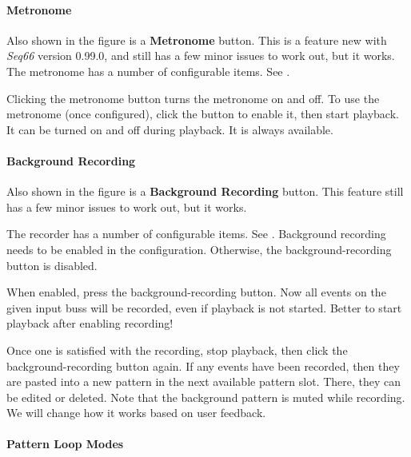 \paragraph{Metronome}
\label{paragraph:patterns_metronome}

   Also shown in the figure is a \textbf{Metronome} button.
   This is a feature new with \textsl{Seq66} version 0.99.0, and still has a few
   minor issues to work out, but it works.
   The metronome has a number of configurable items.
   See .

   Clicking the metronome button turns the metronome on and off.
   To use the metronome (once configured), click the button to enable it,
   then start playback.
   It can be turned on and off during playback.
   It is always available.

\paragraph{Background Recording}
\label{paragraph:patterns_background_recording}

   Also shown in the figure is a \textbf{Background Recording} button.
   This feature still has a few
   minor issues to work out, but it works.

   The recorder has a number of configurable items.
   See .
   Background recording needs to be enabled in the configuration.
   Otherwise, the background-recording button is disabled.

   When enabled, press the background-recording button.
   Now all events on the given input buss will be recorded, even if playback is
   not started.  Better to start playback after enabling recording!

   Once one is satisfied with the recording, stop playback, then
   click the background-recording button again.
   If any events have been recorded, then they are pasted into a new pattern in
   the next available pattern slot.
   There, they can be edited or deleted.
   Note that the background pattern is muted while recording.
   We will change how it works based on user feedback.

\paragraph{Pattern Loop Modes}
\label{paragraph:patterns_loop_modes}

